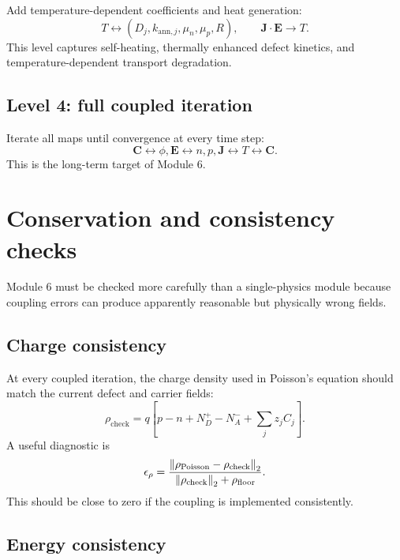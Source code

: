 \documentclass[11pt]{article}
\newcommand{\Evec}{\bm{E}}
\newcommand{\Jvec}{\bm{J}}
\newcommand{\Cvec}{\bm{C}}
\begin{document}
Add temperature-dependent coefficients and heat generation:
\begin{equation}
T \leftrightarrow \left(D_j,k_{\mathrm{ann},j},\mu_n,\mu_p,R\right),
\qquad
\Jvec\cdot\Evec \rightarrow T.
\end{equation}
This level captures self-heating, thermally enhanced defect kinetics, and temperature-dependent transport degradation.

\subsection{Level 4: full coupled iteration}

Iterate all maps until convergence at every time step:
\begin{equation}
\Cvec \leftrightarrow \phi,\Evec \leftrightarrow n,p,\Jvec \leftrightarrow T \leftrightarrow \Cvec.
\end{equation}
This is the long-term target of Module 6.

\section{Conservation and consistency checks}

Module 6 must be checked more carefully than a single-physics module because coupling errors can produce apparently reasonable but physically wrong fields.

\subsection{Charge consistency}

At every coupled iteration, the charge density used in Poisson's equation should match the current defect and carrier fields:
\begin{equation}
\rho_{\mathrm{check}}
=
q\left[p-n+N_D^+-N_A^-+\sum_j z_jC_j\right].
\end{equation}
A useful diagnostic is
\begin{equation}
\epsilon_{\rho}
=
\frac{\norm{\rho_{\mathrm{Poisson}}-\rho_{\mathrm{check}}}_2}
{\norm{\rho_{\mathrm{check}}}_2+\rho_{\mathrm{floor}}}.
\end{equation}
This should be close to zero if the coupling is implemented consistently.

\subsection{Energy consistency}
\end{document}
